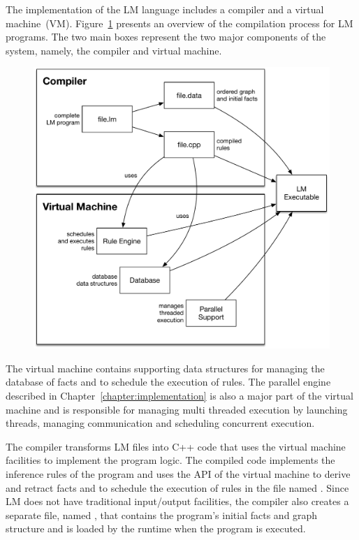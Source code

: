 The implementation of the LM language includes a compiler and a virtual
machine~(VM). Figure~\ref{fig:implementation:overview} presents an overview of
the compilation process for LM programs. The two main boxes represent the two
major components of the system, namely, the compiler and virtual machine.

\begin{figure}[ht]
  \centering
  \includegraphics[width=.75\linewidth]{figures/implementation/overview.pdf}


  \label{fig:implementation:overview}
\end{figure}

The virtual machine contains supporting data structures for managing the
database of facts and to schedule the execution of rules. The parallel engine
described in Chapter~\ref{chapter:implementation} is also a major part of the
virtual machine and is responsible for managing multi threaded execution by
launching threads, managing communication and scheduling concurrent execution.

The compiler transforms LM files into C++ code that uses the virtual machine
facilities to implement the program logic. The compiled code implements the
inference rules of the program and uses the API of the virtual machine to derive
and retract facts and to schedule the execution of rules in the file named
. Since LM does not have traditional input/output facilities, the
compiler also creates a separate file, named , that contains the
program's initial facts and graph structure and is loaded by the runtime when
the program is executed.

